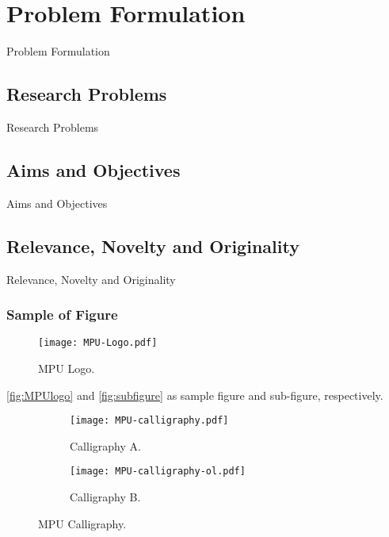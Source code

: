 \chapter{Problem Formulation}\label{ch:3}
\minitoc

Problem Formulation

\newpage

\section{Research Problems}

Research Problems

\section{Aims and Objectives}

Aims and Objectives

\section{Relevance, Novelty and Originality}

Relevance, Novelty and Originality

\subsection{Sample of Figure}

\begin{figure} [htbp]
	\centering
	\texttt{[image: MPU-Logo.pdf]}
	\caption{\gls{MPU} Logo.}
	\label{fig:MPUlogo}
\end{figure}

\autoref{fig:MPUlogo} and \autoref{fig:subfigure} as sample figure and sub-figure, respectively.

\begin{figure} [htbp]
	\centering
	\begin{subfigure}{0.45\linewidth}
		\texttt{[image: MPU-calligraphy.pdf]}
		\caption{Calligraphy A.}
	\end{subfigure}
	\quad
	\begin{subfigure}{0.45\linewidth}
		\texttt{[image: MPU-calligraphy-ol.pdf]}
		\caption{Calligraphy B.}
	\end{subfigure}
	\caption{\gls{MPU} Calligraphy.}
	\label{fig:subfigure}
\end{figure}

\endinput